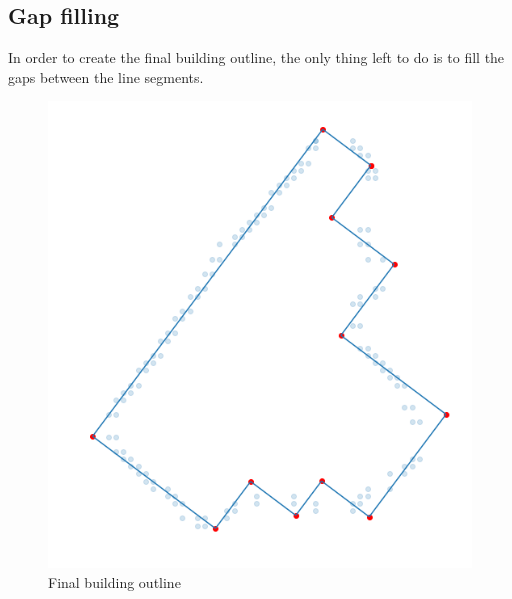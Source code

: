 \subsection{Gap filling}
In order to create the final building outline, the only thing left to do is to fill the gaps between the line segments.

\begin{figure}[H]
    \centering
	\includegraphics[width=0.4\linewidth]{chapters/challenges/images/filled_gaps.png}
	\caption{Final building outline}
	\label{fig:challenges:final_building_outline}
\end{figure}